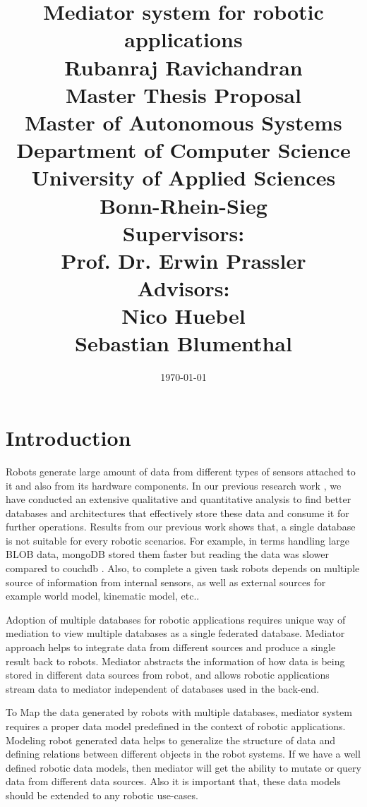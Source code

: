 \documentclass[12pt]{article}
\begin{document}
\title{\Large Mediator system for robotic applications\\
[6mm]
\Large Rubanraj Ravichandran\\
[12mm]
\Large Master Thesis Proposal\\
\small Master of Autonomous Systems\\
[12mm]
\Large Department of Computer Science\\
University of Applied Sciences Bonn-Rhein-Sieg\\
[12mm]
\Large Supervisors:\\
Prof. Dr. Erwin Prassler\\
\Large Advisors:\\
Nico Huebel\\
Sebastian Blumenthal
}
\date{\today}
\maketitle
\newpage
\section{Introduction}

Robots generate large amount of data from different types of sensors attached to it and also from its hardware components. In our previous research work \cite{ravichandranworkbench}, we have conducted an extensive qualitative and quantitative analysis to find better databases and architectures that effectively store these data and consume it for further operations. Results from our previous work shows that, a single database is not suitable for every robotic scenarios. For example, in terms handling large BLOB data, mongoDB stored them faster but reading the data was slower compared to couchdb \cite{ravichandranworkbench}. Also, to complete a given task robots depends on multiple source of information from internal sensors, as well as external sources for example world model, kinematic model, etc.. 

Adoption of multiple databases for robotic applications requires unique way of mediation to view multiple databases as a single federated database. Mediator approach helps to integrate data from different sources and produce a single result back to robots. Mediator abstracts the information of how data is being stored in different data sources from robot, and allows robotic applications stream data to mediator independent of databases used in the back-end.

To Map the data generated by robots with multiple databases, mediator system requires a proper data model predefined in the context of robotic applications. Modeling robot generated data helps to generalize the structure of data and defining relations between different objects in the robot systems. If we have a well defined robotic data models, then mediator will get the ability to mutate or query data from different data sources. Also it is important that, these data models should be extended to any robotic use-cases.
\end{document}
